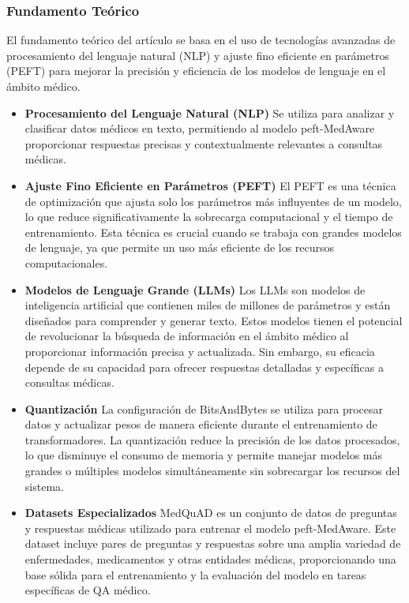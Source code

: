 	\subsubsection{Fundamento Teórico}
		El fundamento teórico del artículo se basa en el uso de tecnologías avanzadas de procesamiento del lenguaje natural (NLP) y ajuste fino eficiente en parámetros (PEFT) para mejorar la precisión y eficiencia de los modelos de lenguaje en el ámbito médico.
	
		\begin{itemize}
			
			\item \textbf{Procesamiento del Lenguaje Natural (NLP)}
			Se utiliza para analizar y clasificar datos médicos en texto, permitiendo al modelo peft-MedAware proporcionar respuestas precisas y contextualmente relevantes a consultas médicas.
			
			\item \textbf{Ajuste Fino Eficiente en Parámetros (PEFT)}
			El PEFT es una técnica de optimización que ajusta solo los parámetros más influyentes de un modelo, lo que reduce significativamente la sobrecarga computacional y el tiempo de entrenamiento. Esta técnica es crucial cuando se trabaja con grandes modelos de lenguaje, ya que permite un uso más eficiente de los recursos computacionales.
			
			\item \textbf{Modelos de Lenguaje Grande (LLMs)}
			Los LLMs son modelos de inteligencia artificial que contienen miles de millones de parámetros y están diseñados para comprender y generar texto. Estos modelos tienen el potencial de revolucionar la búsqueda de información en el ámbito médico al proporcionar información precisa y actualizada. Sin embargo, su eficacia depende de su capacidad para ofrecer respuestas detalladas y específicas a consultas médicas.
			
				\item \textbf{Quantización}
			La configuración de BitsAndBytes se utiliza para procesar datos y actualizar pesos de manera eficiente durante el entrenamiento de transformadores. La quantización reduce la precisión de los datos procesados, lo que disminuye el consumo de memoria y permite manejar modelos más grandes o múltiples modelos simultáneamente sin sobrecargar los recursos del sistema.
			
				\item \textbf{Datasets Especializados}
			MedQuAD es un conjunto de datos de preguntas y respuestas médicas utilizado para entrenar el modelo peft-MedAware. Este dataset incluye pares de preguntas y respuestas sobre una amplia variedad de enfermedades, medicamentos y otras entidades médicas, proporcionando una base sólida para el entrenamiento y la evaluación del modelo en tareas específicas de QA médico.
		
		\end{itemize}


